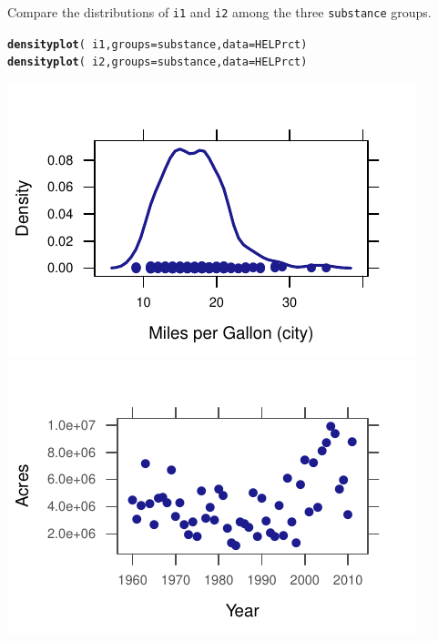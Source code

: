 \documentclass[twoside]{book}\usepackage[]{graphicx}\usepackage[]{xcolor}
\makeatletter
\def\maxwidth{ %
  \ifdim\Gin@nat@width>\linewidth
    \linewidth
  \else
    \Gin@nat@width
  \fi
}
\newcommand{\hlopt}[1]{\textcolor[rgb]{0,0,0}{#1}}%
\newcommand{\hlstd}[1]{\textcolor[rgb]{0.345,0.345,0.345}{#1}}%
\newcommand{\hlkwc}[1]{\textcolor[rgb]{0.333,0.667,0.333}{#1}}%
\newcommand{\hlkwd}[1]{\textcolor[rgb]{0.737,0.353,0.396}{\textbf{#1}}}%
\newenvironment{kframe}{%
 \def\at@end@of@kframe{}%
 \ifinner\ifhmode%
  \def\at@end@of@kframe{\end{minipage}}%
  \begin{minipage}{\columnwidth}%
 \fi\fi%
 \def\FrameCommand##1{\hskip\@totalleftmargin \hskip-\fboxsep
 \colorbox{shadecolor}{##1}\hskip-\fboxsep
     \hskip-\linewidth \hskip-\@totalleftmargin \hskip\columnwidth}%
 \MakeFramed {\advance\hsize-\width
   \@totalleftmargin\z@ \linewidth\hsize
   \@setminipage}}%
 {\par\unskip\endMakeFramed%
 \at@end@of@kframe}
\newenvironment{knitrout}{}{} %
\newcommand{\variable}[1]{{\color{green!50!black}\texttt{#1}}}
\makeatother
\begin{document}
\begin{problem}
	Compare the distributions of \variable{i1} and \variable{i2} among 
	the three \variable{substance} groups.
\end{problem}
\begin{solution}
\begin{knitrout}
\color{fgcolor}\begin{kframe}
\begin{alltt}
\hlkwd{densityplot}\hlstd{(}\hlopt{~}\hlstd{i1,} \hlkwc{groups} \hlstd{= substance,} \hlkwc{data} \hlstd{= HELPrct)}
\hlkwd{densityplot}\hlstd{(}\hlopt{~}\hlstd{i2,} \hlkwc{groups} \hlstd{= substance,} \hlkwc{data} \hlstd{= HELPrct)}
\end{alltt}
\end{kframe}

{\centering \includegraphics[width=\maxwidth]{figures/fig-unnamed-chunk-25-1} 
\includegraphics[width=\maxwidth]{figures/fig-unnamed-chunk-25-2} 

}




\end{knitrout}
\end{solution}
\end{document}
